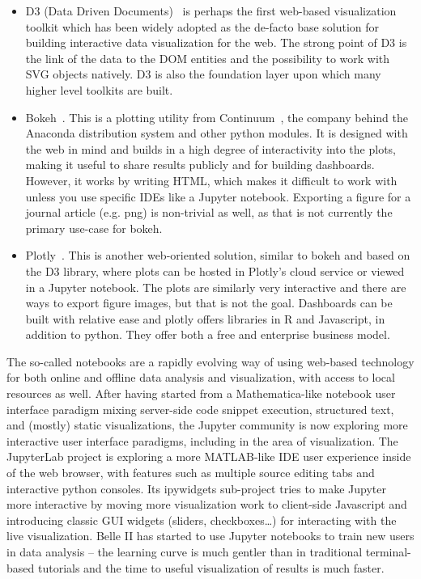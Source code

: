 \documentclass[12pt,a4paper]{article}
\begin{document}
\begin{itemize}
\item D3 (Data Driven Documents)~\cite{D32011} is perhaps the first web-based visualization toolkit which has been widely
adopted as the de-facto base solution for building interactive data visualization for the web. The strong point of D3 is the
link of the data to the DOM entities and the possibility to work with SVG objects natively. D3 is also the foundation layer
upon which many higher level toolkits are built.

\item Bokeh~\cite{Bokeh2014}. This is a plotting utility from Continuum~\cite{continuum}, the company behind the
Anaconda distribution system and other python modules. It is designed with the web in mind and builds in a high degree of
interactivity into the plots, making it useful to share results publicly and for building dashboards. However, it works by
writing HTML, which makes it difficult to work with unless you use specific IDEs like a Jupyter notebook. Exporting a figure
for a journal article (e.g. png) is non-trivial as well, as that is not currently the primary use-case for bokeh.

\item Plotly~\cite{Plotly2015}. This is another web-oriented solution, similar to bokeh and based on the D3 library, where plots
can be hosted in Plotly’s cloud service or viewed in a Jupyter notebook. The plots are similarly very interactive and there
are ways to export figure images, but that is not the goal. Dashboards can be built with relative ease and plotly offers
libraries in R and Javascript, in addition to python. They offer both a free and enterprise business model.
\end{itemize}

The so-called notebooks are a rapidly evolving way of using web-based technology for both online and offline data analysis and
visualization, with access to local resources as well. After having started from a Mathematica-like notebook user interface
paradigm mixing server-side code snippet execution, structured text, and (mostly) static visualizations, the Jupyter community
is now exploring more interactive user interface paradigms, including in the area of visualization. The JupyterLab project is
exploring a more MATLAB-like IDE user experience inside of the web browser, with features such as multiple source editing tabs
and interactive python consoles. Its ipywidgets sub-project tries to make Jupyter more interactive by moving more visualization
work to client-side Javascript and introducing classic GUI widgets (sliders, checkboxes…) for interacting with the live visualization.
Belle II has started to use Jupyter notebooks to train new users in data analysis – the learning curve is much gentler than in
traditional terminal-based tutorials and the time to useful visualization of results is much faster.
\end{document}
